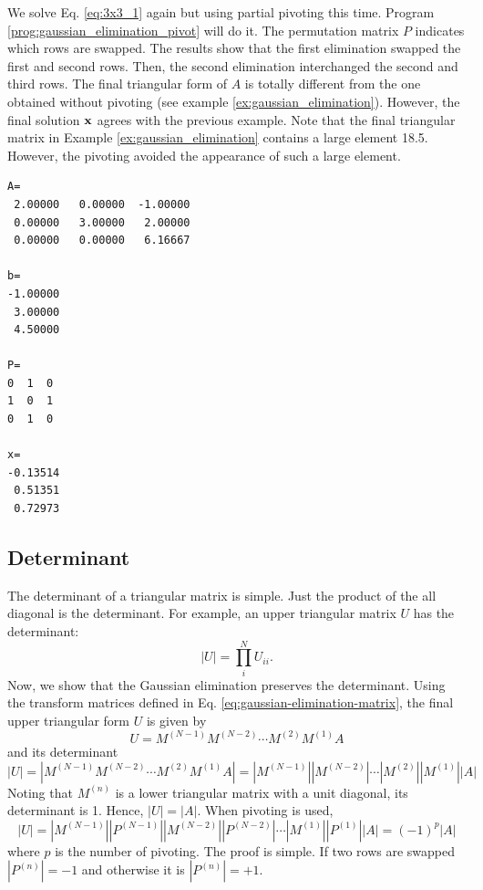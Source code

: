 \bigskip
\begin{example}\label{ex:gaussian_elimination_pivot}
We solve Eq. \eqref{eq:3x3_1} again but using partial pivoting this time. Program \ref{prog:gaussian_elimination_pivot} will do it.
The permutation matrix $P$ indicates which rows are swapped.
The results show that the first elimination swapped the first and second rows.  Then, the second elimination interchanged the second and third rows.  The final triangular form of $A$ is totally different from the one obtained without pivoting (see example \ref{ex:gaussian_elimination}).  However, the final solution $\vb{x}$  agrees with the previous example.  Note that the final triangular matrix in Example \ref{ex:gaussian_elimination} contains a large element 18.5.  However, the pivoting avoided the appearance of such a large element.
\begin{center}
\begin{minipage}{2.5in}
\small
\begin{Verbatim}[frame=single]
A=
 2.00000   0.00000  -1.00000
 0.00000   3.00000   2.00000
 0.00000   0.00000   6.16667

b=
-1.00000
 3.00000
 4.50000

P=
0  1  0
1  0  1
0  1  0

x=
-0.13514
 0.51351
 0.72973
\end{Verbatim}
\normalsize
\end{minipage}
\end{center}

\end{example}

\noindent
\subsection{Determinant}

The determinant of a triangular matrix is simple.  Just the product of the all diagonal is the determinant. For example, an upper triangular matrix $U$ has the determinant:
\begin{equation}
|U| = \prod_i^{N} U_{ii}.
\end{equation}
Now, we show that the Gaussian elimination preserves the determinant. Using the transform matrices defined in Eq. \eqref{eq:gaussian-elimination-matrix}, the final upper triangular form $U$ is given by
\begin{equation}\label{eq:total_M}
U = M^{(N-1)} M^{(N-2)} \cdots M^{(2)} M^{(1)} A
\end{equation}
and its determinant
\begin{equation}
|U| = |M^{(N-1)} M^{(N-2)} \cdots M^{(2)} M^{(1)} A| = |M^{(N-1)}| |M^{(N-2)}| \cdots |M^{(2)}| |M^{(1)}| |A|
\end{equation}
Noting that $M^{(n)}$ is a lower triangular matrix with a unit diagonal, its determinant is 1.  Hence, $|U|=|A|$.
When pivoting is used, 
\begin{equation}
|U| =  |M^{(N-1)}| |P^{(N-1)}| |M^{(N-2)}| |P^{(N-2)}| \cdots |M^{(1)}| |P^{(1)}| |A| = (-1)^p |A|
\end{equation}
where $p$ is the number of pivoting. The proof is simple. If two rows are swapped $|P^{(n)}|=-1$ and otherwise it is $|P^{(n)}|=+1$.

